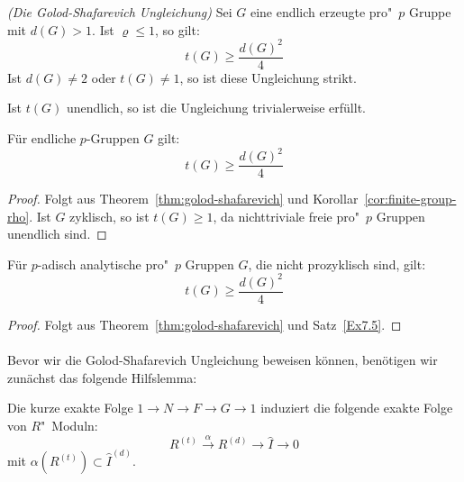 \documentclass[11pt,a4paper,openany]{memoir}
\begin{document}
\begin{theorem}\textit{(Die Golod-Shafarevich Ungleichung)}\label{thm:golod-shafarevich}
Sei $G$ eine endlich erzeugte pro"~$p$ Gruppe mit $d(G)>1$. Ist $\varrho\leq 1$, so gilt:
\[ t(G)\geq \frac{d(G)^2}{4} \]
Ist $d(G)\neq 2$ oder $t(G)\neq 1$, so ist diese Ungleichung strikt.
\end{theorem}

\begin{remark}
Ist $t(G)$ unendlich, so ist die Ungleichung trivialerweise erfüllt.
\end{remark}

\begin{corollary}
Für endliche $p$-Gruppen $G$ gilt:
\[t(G)\geq \frac{d(G)^2}{4} \]
\end{corollary}

\begin{proof}
Folgt aus Theorem~\ref{thm:golod-shafarevich} und Korollar~\ref{cor:finite-group-rho}. Ist $G$ zyklisch, so ist $t(G)\geq 1$, da nichttriviale freie pro"~$p$ Gruppen unendlich sind.
\end{proof}

\begin{corollary}
Für $p$-adisch analytische pro"~$p$ Gruppen $G$, die nicht prozyklisch sind, gilt:
\[t(G)\geq \frac{d(G)^2}{4}\]
\end{corollary}

\begin{proof}
Folgt aus Theorem~\ref{thm:golod-shafarevich} und Satz~\ref{Ex7.5}.
\end{proof}

\paragraph{} Bevor wir die Golod-Shafarevich Ungleichung beweisen können, benötigen wir zunächst das folgende Hilfslemma:

\begin{lemma}\label{D2}
Die kurze exakte Folge $1\to N\to F\to G\to 1$ induziert die folgende exakte Folge von $R$"~Moduln:
\[ R^{(t)}\stackrel{\alpha}{\to} R^{(d)}\to \widehat{I}\to 0 \]
mit $\alpha(R^{(t)})\subset \widehat{I}^{(d)}$.
\end{lemma}
\end{document}
